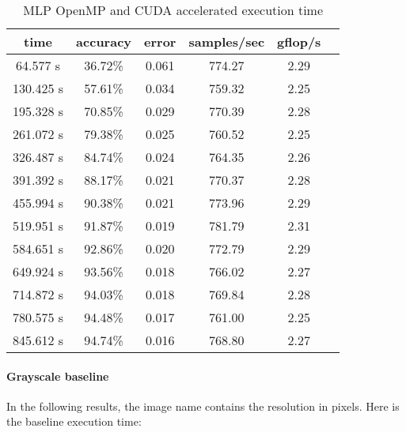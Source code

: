 \documentclass[11pt]{article}
\begin{document}
\begin{table}[h]	\centering
	\begin{tabular}{|c|c|c|c|c|c|}
		\hline
		\textbf{time} & \textbf{accuracy} & \textbf{error} & \textbf{samples/sec} & \textbf{gflop/s} \\ \hline
		64.577 s      & 36.72\%           & 0.061          & 774.27               & 2.29             \\ \hline
		130.425 s     & 57.61\%           & 0.034          & 759.32               & 2.25             \\ \hline
		195.328 s     & 70.85\%           & 0.029          & 770.39               & 2.28             \\ \hline
		261.072 s     & 79.38\%           & 0.025          & 760.52               & 2.25             \\ \hline
		326.487 s     & 84.74\%           & 0.024          & 764.35               & 2.26             \\ \hline
		391.392 s     & 88.17\%           & 0.021          & 770.37               & 2.28             \\ \hline
		455.994 s     & 90.38\%           & 0.021          & 773.96               & 2.29             \\ \hline
		519.951 s     & 91.87\%           & 0.019          & 781.79               & 2.31             \\ \hline
		584.651 s     & 92.86\%           & 0.020          & 772.79               & 2.29             \\ \hline
		649.924 s     & 93.56\%           & 0.018          & 766.02               & 2.27             \\ \hline
		714.872 s     & 94.03\%           & 0.018          & 769.84               & 2.28             \\ \hline
		780.575 s     & 94.48\%           & 0.017          & 761.00               & 2.25             \\ \hline
		845.612 s     & 94.74\%           & 0.016          & 768.80               & 2.27             \\ \hline
	\end{tabular}
	\caption{MLP OpenMP and CUDA accelerated execution time}
	\label{tab:mlp_accelerated_cuda}
\end{table}

\paragraph*{Grayscale baseline} In the following results, the image name contains the resolution in pixels. Here is the baseline execution time:
\end{document}

